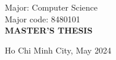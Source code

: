 \documentclass[a4paper,oneside]{book}
\begin{document}
\begin{titlepage}
\begin{center}
    \vspace{0.8cm}
    {\fontsize{14.4pt}{1} Major: Computer Science}\\[.2cm]

    \vspace{0.2cm}
    {\fontsize{14.4pt}{1} Major code: 8480101}\\[.2cm]

    \vspace{0.8cm}
    {\fontsize{14.4pt}{1}\selectfont \textbf{MASTER'S THESIS}}
  \end{center}

  \vspace{1.0cm}

  \hspace{.5cm}

  \begin{center}
    {{\fontsize{12pt}{1} Ho Chi Minh City, May 2024}}
  \end{center}
\end{titlepage}
\end{document}
